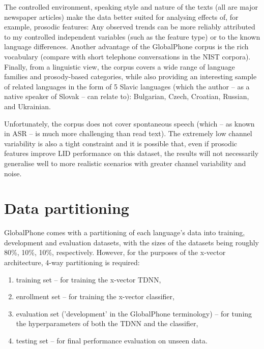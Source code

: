 \documentclass[bsc,frontabs,twoside,singlespacing,parskip,deptreport]{infthesis}
\begin{document}
{{    %
    The controlled environment, speaking style and nature of the texts (all are major newspaper articles) make the data better suited for analysing effects of, for example, prosodic features: Any observed trends can be more reliably attributed to my controlled independent variables (such as the feature type) or to the known language differences.
    Another advantage of the GlobalPhone corpus is the rich vocabulary (compare with short telephone conversations in the NIST corpora).
    Finally, from a linguistic view, the corpus covers a wide range of language families and prosody-based categories, while also providing an interesting sample of related languages in the form of 5 Slavic languages (which the author -- as a native speaker of Slovak -- can relate to): Bulgarian, Czech, Croatian, Russian, and Ukrainian.

    Unfortunately, the corpus does not cover spontaneous speech (which -- as known in ASR -- is much more challenging than read text). The extremely low channel variability is also a tight constraint and it is possible that, even if prosodic features improve LID performance on this dataset, the results will not necessarily generalise well to more realistic scenarios with greater channel variability and noise.    
  }

  \section{Data partitioning}{
    GlobalPhone comes with a partitioning of each language's data into training, development and evaluation datasets, with the sizes of the datasets being roughly 80\%, 10\%, 10\%, respectively. However, for the purposes of the x-vector architecture, 4-way partitioning is required:
    \begin{enumerate}
      \item{training set -- for training the x-vector TDNN,}
      \item{enrollment set -- for training the x-vector classifier,}
      \item{evaluation set ('development' in the GlobalPhone terminology) -- for tuning the hyperparameters of both the TDNN and the classifier,}
      \item{testing set -- for final performance evaluation on unseen data.}
    \end{enumerate}

}}
\end{document}
